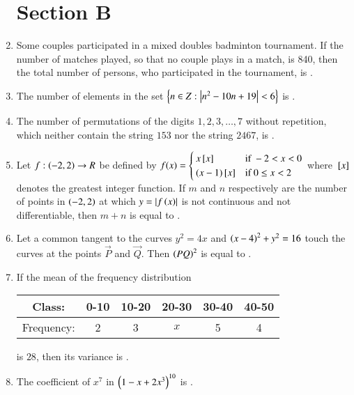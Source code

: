 \documentclass[journal]{IEEEtran}
\begin{document}
\begin{enumerate}[start=16]
\section*{Section B}
\item Some couples participated in a mixed doubles badminton tournament. If the number of matches played, so that no couple plays in a match, is 840, then the total number of persons, who participated in the tournament, is \underline{\hspace{1cm}}.
\item The number of elements in the set $\left\{n \in Z :\left\vert n^2 - 10n + 19\right\vert < 6 \right\}$ is \underline{\hspace{1cm}}.
\item The number of permutations of the digits $1, 2, 3, \dots, 7$ without repetition, which neither contain the string $153$ nor the string $2467$, is \underline{\hspace{1cm}}.
\item Let $f: \left(-2, 2\right) \to R$ be defined by
$f(x) = \begin{cases}
x{}\left[x\right] & \text{if } -2 < x < 0 \\
(x-1){}\left[x\right] & \text{if } 0 \leq x < 2
\end{cases}$
where ${}\left[x\right]$ denotes the greatest integer function. If $m$ and $n$ respectively are the number of points in $\left(-2, 2\right)$ at which $y =\left\vert f\left(x\right)\right\vert$ is not continuous and not differentiable, then $m + n$ is equal to \underline{\hspace{1cm}}.
\item Let a common tangent to the curves $y^2 = 4x$ and $\left(x - 4\right)^2 + y^2 = 16$ touch the curves at the points $\vec{P}$ and $\vec{Q}$. Then $\left(PQ\right)^2$ is equal to \underline{\hspace{1cm}}.
\item If the mean of the frequency distribution
\begin{table}[h!]
\centering
\begin{tabular}{|c|c|c|c|c|c|}
\hline
Class: & 0-10 & 10-20 & 20-30 & 30-40 & 40-50 \\
\hline
Frequency: & 2 & 3 & $x$ & 5 & 4 \\
\hline
\end{tabular}
\end{table}
is $28$, then its variance is \underline{\hspace{1cm}}.
\item The coefficient of $x^7$ in $\left(1 - x + 2x^3\right)^{10}$ is \underline{\hspace{1cm}}.

\end{enumerate}
\end{document}
